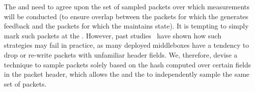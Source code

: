  The \inbox and \outbox need to agree upon the set of sampled packets over which measurements will be conducted (to ensure overlap between the packets for which the \outbox generates feedback and the packets for which the \inbox maintains state). It is tempting to simply mark  such packets at the \inbox. However, past studies~\cite{ipoptions, mboxbadness, quic} have shown how such strategies may fail in practice, as many deployed middleboxes have a tendency to drop or re-write packets with unfamiliar header fields. 
We, therefore, devise a technique to sample packets solely based on the hash computed over certain fields in the packet header, which allows the \inbox and the \outbox to independently sample the same set of packets.







